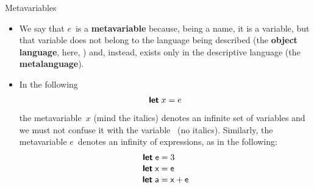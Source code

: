 %
\begin{frame}[fragile]{Metavariables}

  \begin{itemize}

    \item We say that \(e\)~is a \textbf{metavariable} because, being
      a name, it is a variable, but that variable does not belong to
      the language being described (the \textbf{object language},
      here, \OCaml) and, instead, exists only in the descriptive
      language (the \textbf{metalanguage}).

    \item In the following
      {\setlength{\abovedisplayskip}{2pt}
       \setlength{\belowdisplayskip}{2pt}
      \begin{equation*}
        \textsf{\textbf{let}} \; x = e
      \end{equation*}}
      the metavariable~\(x\) (mind the italics) denotes an infinite
      set of \OCaml variables and we must not confuse it with the
      \OCaml variable~ (no italics). Similarly, the
      metavariable \(e\)~denotes an infinity of expressions, as in the
      following:
      {\setlength{\belowdisplayskip}{2pt}
      \begin{equation*}
        \begin{aligned}
          \textsf{\textbf{let}}\; \textsf{e} &= 3\\[-2pt]
          \textsf{\textbf{let}}\; \textsf{x} &= \textsf{e}\\[-2pt]
          \textsf{\textbf{let}}\; \textsf{a} &= \textsf{x} + \textsf{e}
        \end{aligned}
      \end{equation*}}

  \end{itemize}

\end{frame}

